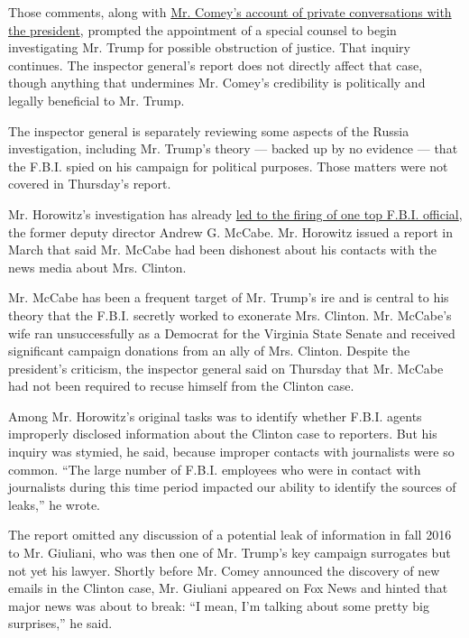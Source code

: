 Those comments, along with
\href{https://www.nytimes.com/2017/05/18/us/politics/james-comey-memo-fbi-trump.html}{Mr.
Comey's account of private conversations with the president}, prompted
the appointment of a special counsel to begin investigating Mr. Trump
for possible obstruction of justice. That inquiry continues. The
inspector general's report does not directly affect that case, though
anything that undermines Mr. Comey's credibility is politically and
legally beneficial to Mr. Trump.

The inspector general is separately reviewing some aspects of the Russia
investigation, including Mr. Trump's theory --- backed up by no evidence
--- that the F.B.I. spied on his campaign for political purposes. Those
matters were not covered in Thursday's report.

Mr. Horowitz's investigation has already
\href{https://www.nytimes.com/2018/03/16/us/politics/andrew-mccabe-fbi-fired.html}{led
to the firing of one top F.B.I. official}, the former deputy director
Andrew G. McCabe. Mr. Horowitz issued a report in March that said Mr.
McCabe had been dishonest about his contacts with the news media about
Mrs. Clinton.

Mr. McCabe has been a frequent target of Mr. Trump's ire and is central
to his theory that the F.B.I. secretly worked to exonerate Mrs. Clinton.
Mr. McCabe's wife ran unsuccessfully as a Democrat for the Virginia
State Senate and received significant campaign donations from an ally of
Mrs. Clinton. Despite the president's criticism, the inspector general
said on Thursday that Mr. McCabe had not been required to recuse himself
from the Clinton case.

Among Mr. Horowitz's original tasks was to identify whether F.B.I.
agents improperly disclosed information about the Clinton case to
reporters. But his inquiry was stymied, he said, because improper
contacts with journalists were so common. ``The large number of F.B.I.
employees who were in contact with journalists during this time period
impacted our ability to identify the sources of leaks,'' he wrote.

The report omitted any discussion of a potential leak of information in
fall 2016 to Mr. Giuliani, who was then one of Mr. Trump's key campaign
surrogates but not yet his lawyer. Shortly before Mr. Comey announced
the discovery of new emails in the Clinton case, Mr. Giuliani appeared
on Fox News and hinted that major news was about to break: ``I mean, I'm
talking about some pretty big surprises,'' he said.

